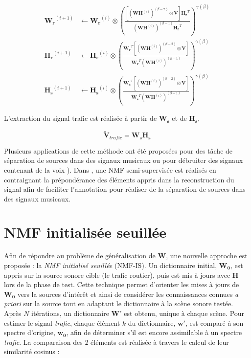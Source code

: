 \begin{subequations}\label{eq:WH-SSupdate}
\begin{align}
\mathbf{W_r}^{(i+1)} &\leftarrow \mathbf{W_r}^{(i)}\otimes\left(\frac{\left[\left(\mathbf{WH}^{(i)} \right)^{(\beta-2)}\otimes\mathbf{V} \right]\mathbf{H_r}^T}{\left(\mathbf{WH}^{(i)} \right)^{(\beta-1)}\mathbf{H_r}^T}\right)^{\gamma(\beta)}\label{eq:W_r_SS}\\
\mathbf{H_r}^{(i+1)} &\leftarrow \mathbf{H_r}^{(i)}\otimes\left(\frac{\mathbf{W_r}^T \left[\left(\mathbf{WH}^{(i)} \right)^{(\beta-2)}\otimes\mathbf{V} \right]}{\mathbf{W_r}^T \left(\mathbf{WH}^{(i)} \right)^{(\beta-1)}}\right)^{\gamma(\beta)}\label{eq:H_r_SS}\\
\mathbf{H_s}^{(i+1)} &\leftarrow \mathbf{H_s}^{(i)}\otimes\left(\frac{\mathbf{W_s}^T \left[\left(\mathbf{WH}^{(i)} \right)^{(\beta-2)}\otimes\mathbf{V} \right]}{\mathbf{W_s}^T \left(\mathbf{WH}^{(i)} \right)^{(\beta-1)}}\right)^{\gamma(\beta)}\label{eq:H_s_SS}
\end{align}
\end{subequations}

L'extraction du signal trafic est réalisée à partir de $\mathbf{W_s}$ et de $\mathbf{H_s}$, 

\begin{equation}
\mathbf{\tilde{V}}_{trafic} = \mathbf{W_s H_s}
\end{equation}

Plusieurs applications de cette méthode ont été proposées pour des tâche de séparation de sources dans des signaux musicaux\cite{smaragdis2007supervised} ou pour débruiter des signaux contenant de la voix \cite{mysore2011non, duan2012online}). Dans \cite{lefevre2012semi}, une NMF semi-supervisée est réalisés en contraignant la prépondérance des éléments appris dans la reconstruction du signal afin de faciliter l'annotation pour réaliser de la séparation de sources dans des signaux musicaux.


\section{NMF initialisée seuillée}\label{sec:NMF_TI}

Afin de répondre au problème de généralisation de $\mathbf{W}$, une nouvelle approche est proposée : la \textit{NMF initialisé seuillée} (NMF-IS). Un dictionnaire initial, $\mathbf{W_0}$, est appris sur la source sonore cible (le trafic routier), puis est mis à jours avec $\mathbf{H}$ lors de la phase de test. 
Cette technique permet d'orienter les mises à jours de $\mathbf{W_0}$ vers la sources d'intérêt et ainsi de considérer les connaissances connues \textit{a priori} sur la source tout en adaptant le dictionnaire à la scène sonore testée. Après $N$ itérations, un dictionnaire $\mathbf{W'}$ est obtenu, unique à chaque scène. Pour estimer le signal \textit{trafic}, chaque élément $k$ du dictionnaire, $\mathbf{w'}$, est comparé à son spectre d'origine, $\mathbf{w_0}$, afin de déterminer s'il est encore assimilable à un spectre \textit{trafic}. La comparaison des 2 éléments est réalisée à travers le calcul de leur similarité cosinus : 

